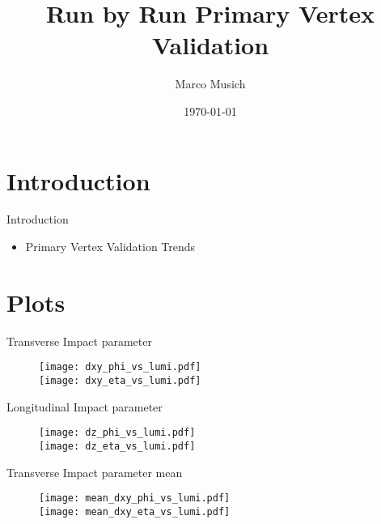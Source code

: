 \documentclass{beamer}
\title[Primary Vertex Validation]{Run by Run Primary Vertex Validation}
\author{Marco Musich}
\institute{KIT - Karlsurher Institut f\"ur Technologie}
\date{\today}
\begin{document}
\begin{frame}
\titlepage
\end{frame}

\section{Introduction}
\begin{frame}{Introduction}
{
\begin{itemize}
 \item Primary Vertex Validation Trends
\end{itemize}
}
\end{frame}



\section{Plots}

\begin{frame}{Transverse Impact parameter}
  \begin{figure}
    \centering
    \texttt{[image: dxy\_phi\_vs\_lumi.pdf]}\\
    \texttt{[image: dxy\_eta\_vs\_lumi.pdf]}
  \end{figure}
\end{frame}

\begin{frame}{Longitudinal Impact parameter}
  \begin{figure}
    \centering
    \texttt{[image: dz\_phi\_vs\_lumi.pdf]}\\
    \texttt{[image: dz\_eta\_vs\_lumi.pdf]}
  \end{figure}
\end{frame}

\begin{frame}{Transverse Impact parameter mean}
  \begin{figure}
    \centering
    \texttt{[image: mean\_dxy\_phi\_vs\_lumi.pdf]}\\
    \texttt{[image: mean\_dxy\_eta\_vs\_lumi.pdf]}
  \end{figure}
\end{frame}
\end{document}
